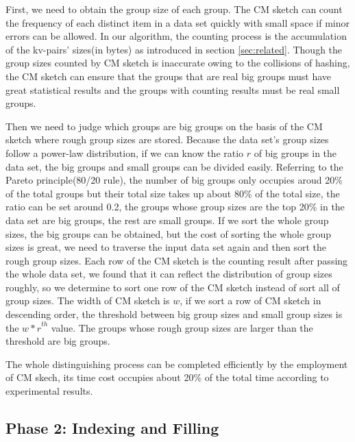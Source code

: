 First, we need to obtain the group size of each group. The CM sketch can count the frequency of each distinct item in a data set quickly with small space if minor errors can be allowed. In our algorithm, the counting process is the accumulation of the kv-pairs' sizes(in bytes) as introduced in section \ref{sec:related}. Though the group sizes counted by CM sketch is inaccurate owing to the collisions of hashing, the CM sketch can ensure that the groups that are real big groups must have great statistical results and the groups with counting results must be real small groups.   

Then we need to judge which groups are big groups on the basis of the CM sketch where rough group sizes are stored. Because the data set's group sizes follow a power-law distribution, if we can know the ratio $r$ of big groups in the data set, the big groups and small groups can be divided easily. Referring to the Pareto principle(80/20 rule), the number of big groups only occupies aroud 20\% of the total groups but their total size takes up about 80\% of the total size, the ratio can be set around 0.2, the groups whose group sizes are the top 20\% in the data set are big groups, the rest are small groups. If we sort the whole group sizes, the big groups can be obtained, but the cost of sorting the whole group sizes is great, we need to traverse the input data set again and then sort the rough group sizes. Each row of the CM sketch is the counting result after passing the whole data set, we found that it can reflect the distribution of group sizes roughly, so we determine to sort one row of the CM sketch instead of sort all of group sizes. The width of CM sketch is $w$, if we sort a row of CM sketch in descending order, the threshold between big group sizes and small group sizes is the ${w*r}^{th}$ value. The groups whose rough group sizes are larger than the threshold are big groups. 

The whole distinguishing process can be completed efficiently by the employment of CM skech, its time cost occupies about 20\% of the total time according to experimental results.

\subsection{Phase 2: Indexing and Filling} 

